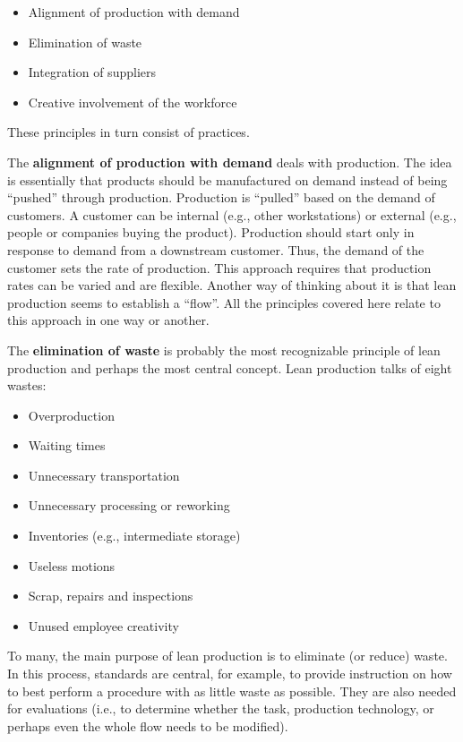 \documentclass[
  12pt,
]{scrbook}
\providecommand{\tightlist}{%
  \setlength{\itemsep}{0pt}\setlength{\parskip}{0pt}}
\begin{document}
\begin{itemize}
\tightlist
\item
  Alignment of production with demand
\item
  Elimination of waste
\item
  Integration of suppliers
\item
  Creative involvement of the workforce
\end{itemize}

These principles in turn consist of practices.

The \textbf{alignment of production with demand} deals with production. The idea is essentially that products should be manufactured on demand instead of being ``pushed'' through production. Production is ``pulled'' based on the demand of customers. A customer can be internal (e.g., other workstations) or external (e.g., people or companies buying the product). Production should start only in response to demand from a downstream customer. Thus, the demand of the customer sets the rate of production. This approach requires that production rates can be varied and are flexible. Another way of thinking about it is that lean production seems to establish a ``flow''. All the principles covered here relate to this approach in one way or another.

The \textbf{elimination of waste} is probably the most recognizable principle of lean production and perhaps the most central concept. Lean production talks of eight wastes:

\begin{itemize}
\tightlist
\item
  Overproduction
\item
  Waiting times
\item
  Unnecessary transportation
\item
  Unnecessary processing or reworking
\item
  Inventories (e.g., intermediate storage)
\item
  Useless motions
\item
  Scrap, repairs and inspections
\item
  Unused employee creativity
\end{itemize}

To many, the main purpose of lean production is to eliminate (or reduce) waste. In this process, standards are central, for example, to provide instruction on how to best perform a procedure with as little waste as possible. They are also needed for evaluations (i.e., to determine whether the task, production technology, or perhaps even the whole flow needs to be modified).
\end{document}
